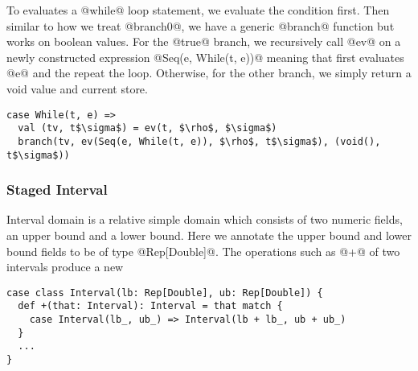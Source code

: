 To evaluates a @while@ loop statement, we evaluate the condition first. Then
similar to how we treat @branch0@, we have a generic @branch@ function but works
on boolean values. For the @true@ branch, we recursively call @ev@ on a newly
constructed expression @Seq(e, While(t, e))@ meaning that first evaluates @e@
and the repeat the loop. Otherwise, for the other branch, we simply return a
void value and current store.

\begin{lstlisting}
case While(t, e) =>
  val (tv, t$\sigma$) = ev(t, $\rho$, $\sigma$)
  branch(tv, ev(Seq(e, While(t, e)), $\rho$, t$\sigma$), (void(), t$\sigma$))
\end{lstlisting}

\subsubsection{Staged Interval}

Interval domain is a relative simple domain which consists of two numeric
fields, an upper bound and a lower bound. Here we annotate the upper bound and
lower bound fields to be of type @Rep[Double]@. The operations such as @+@ of
two intervals produce a new

\begin{lstlisting}
case class Interval(lb: Rep[Double], ub: Rep[Double]) {
  def +(that: Interval): Interval = that match {
    case Interval(lb_, ub_) => Interval(lb + lb_, ub + ub_)
  }
  ...
}
\end{lstlisting}

\fi
